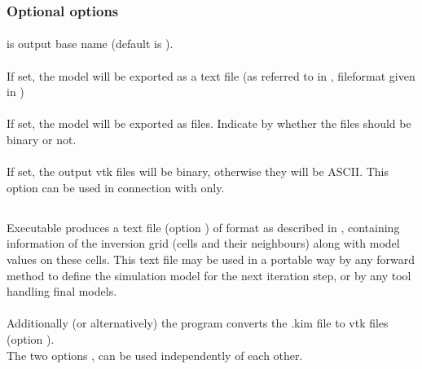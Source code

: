 \subsubsection{Optional options}
\paragraph{}
 is output base name (default is ).
\paragraph{}
If set, the model will be exported as a text file (as referred to in ,
fileformat given in )
\paragraph{}
If set, the model will be exported as  files. 
Indicate by  whether the  files should be binary or not.
\paragraph{}
If set, the output vtk files will be binary, otherwise they will be ASCII. This option 
can be used in connection with  only.
%
%
\subsection{} \label{programs_scripts,sec:bin_prog,sec:exp_Kim}
Executable  produces a text file (option ) of format as described in
, containing information of the inversion grid (cells and
their neighbours) along with model values on these cells.
This text file may be used in a portable way by any forward method to define the simulation 
model for the next iteration step, or by any tool handling final models.\\
\\
Additionally (or alternatively) the program converts the .kim file to vtk files (option ).\\
The two options  ,  can be used independently of each other.
